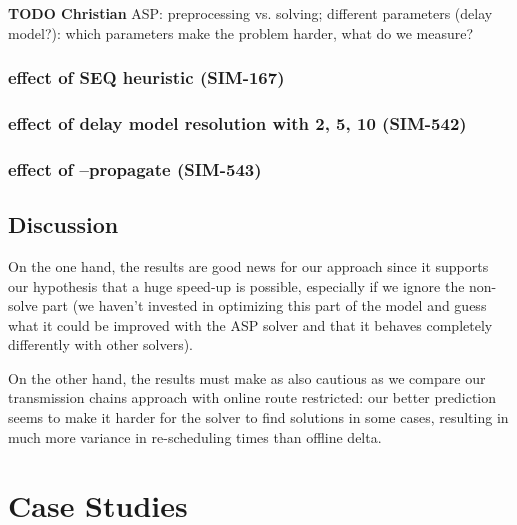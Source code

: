 \documentclass{article}
\begin{document}
\begin{mdframed}
{\bf TODO Christian} ASP: preprocessing vs. solving; different parameters (delay model?): which parameters make the problem harder, what do we measure?
\end{mdframed}

\subsubsection{effect of SEQ heuristic (SIM-167)}

\subsubsection{effect of delay model resolution with 2, 5, 10 (SIM-542)}

\subsubsection{effect of --propagate (SIM-543)}



\subsection{Discussion}\label{subsec:results_discussion}

On the one hand, the results are good news for our approach since it supports our hypothesis that a huge speed-up is possible, especially if we ignore the non-solve part (we haven't invested in optimizing this part of the model and guess what it could be improved with the ASP solver and that it behaves completely differently with other solvers).

On the other hand, the results must make as also cautious as we compare our  transmission chains approach with online route restricted: our better prediction seems to make it harder for the solver to find solutions in some cases, resulting in much more variance in re-scheduling times than offline delta.

\section{Case Studies}\label{sec:CaseStudies}
\end{document}
